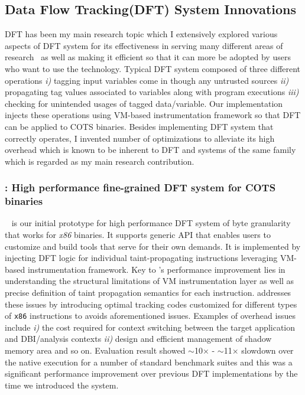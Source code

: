 \documentclass[letterpaper, 10pt]{article}
\begin{document}
\begin{small}
\subsection*{Data Flow Tracking(DFT) System Innovations} 
%
DFT has been my main research topic which I extensively explored various
aspects of DFT system for its effectiveness in serving many different areas of
research~\cite{libdft:2012vee, tfa:2012ndss, sreplica:2013ccs} as well as
making it efficient so that it can more be adopted by users who want to use the
technology.
%
Typical DFT system composed of three different operations {\it i)} tagging
input variables come in though any untrusted sources {\it ii)} propagating tag
values associated to variables along with program executions {\it iii)}
checking for unintended usages of tagged data/variable. Our implementation
injects these operations using VM-based instrumentation framework so that DFT
can be applied to COTS binaries.
%
Besides implementing DFT system that correctly operates, I invented number of
optimizations to alleviate its high overhead which is known to be inherent to
DFT and systems of the same family which is regarded as my main research
contribution.

\subsubsection*{\libdft: High performance fine-grained DFT system for COTS binaries}

\libdft~\cite{libdft:2012vee} is our initial prototype for high performance DFT
system of byte granularity that works for {\it x86} binaries. 
%
It supports generic API that enables users to customize and build tools that
serve for their own demands. 
%
It is implemented by injecting DFT logic for individual taint-propagating
instructions leveraging VM-based instrumentation framework. 
%
Key to \libdft's performance improvement lies in understanding the structural
limitations of VM instrumentation layer as well as precise definition of taint
propagation semantics for each instruction. \libdft  addresses these issues by
introducing optimal tracking codes customized for different types of {\tt x86}
instructions to avoids aforementioned issues. Examples of overhead issues include
{\it i)} the cost required for context switching between the target application
and DBI/analysis contexts {\it ii)} design and efficient management of shadow
memory area and so on. 
%
Evaluation result showed $\sim$10$\times$ - $\sim$11$\times$ slowdown over the
native execution for a number of standard benchmark suites and this was a
significant performance improvement over previous DFT implementations by the
time we introduced the system.


\end{small}
\end{document}
